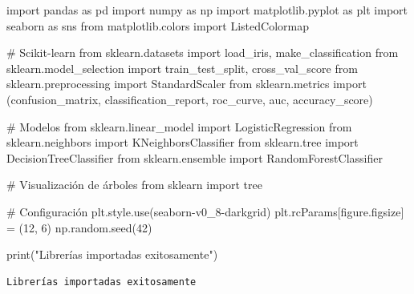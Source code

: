 \documentclass[
  doc,
  floatsintext,
  longtable,
  a4paper,
  nolmodern,
  notxfonts,
  notimes,
  12pt,
  colorlinks=true,linkcolor=blue,citecolor=blue,urlcolor=blue]{apa7}
\newenvironment{Shaded}{\begin{snugshade}}{\end{snugshade}}
\newcommand{\BuiltInTok}[1]{\textcolor[rgb]{0.00,0.23,0.31}{#1}}
\newcommand{\CommentTok}[1]{\textcolor[rgb]{0.37,0.37,0.37}{#1}}
\newcommand{\DecValTok}[1]{\textcolor[rgb]{0.68,0.00,0.00}{#1}}
\newcommand{\ImportTok}[1]{\textcolor[rgb]{0.00,0.46,0.62}{#1}}
\newcommand{\NormalTok}[1]{\textcolor[rgb]{0.00,0.23,0.31}{#1}}
\newcommand{\OperatorTok}[1]{\textcolor[rgb]{0.37,0.37,0.37}{#1}}
\newcommand{\StringTok}[1]{\textcolor[rgb]{0.13,0.47,0.30}{#1}}
\begin{document}
\begin{Shaded}
\begin{Highlighting}[]
\ImportTok{import}\NormalTok{ pandas }\ImportTok{as}\NormalTok{ pd}
\ImportTok{import}\NormalTok{ numpy }\ImportTok{as}\NormalTok{ np}
\ImportTok{import}\NormalTok{ matplotlib.pyplot }\ImportTok{as}\NormalTok{ plt}
\ImportTok{import}\NormalTok{ seaborn }\ImportTok{as}\NormalTok{ sns}
\ImportTok{from}\NormalTok{ matplotlib.colors }\ImportTok{import}\NormalTok{ ListedColormap}

\CommentTok{\# Scikit{-}learn}
\ImportTok{from}\NormalTok{ sklearn.datasets }\ImportTok{import}\NormalTok{ load\_iris, make\_classification}
\ImportTok{from}\NormalTok{ sklearn.model\_selection }\ImportTok{import}\NormalTok{ train\_test\_split, cross\_val\_score}
\ImportTok{from}\NormalTok{ sklearn.preprocessing }\ImportTok{import}\NormalTok{ StandardScaler}
\ImportTok{from}\NormalTok{ sklearn.metrics }\ImportTok{import}\NormalTok{ (confusion\_matrix, classification\_report, }
\NormalTok{                             roc\_curve, auc, accuracy\_score)}

\CommentTok{\# Modelos}
\ImportTok{from}\NormalTok{ sklearn.linear\_model }\ImportTok{import}\NormalTok{ LogisticRegression}
\ImportTok{from}\NormalTok{ sklearn.neighbors }\ImportTok{import}\NormalTok{ KNeighborsClassifier}
\ImportTok{from}\NormalTok{ sklearn.tree }\ImportTok{import}\NormalTok{ DecisionTreeClassifier}
\ImportTok{from}\NormalTok{ sklearn.ensemble }\ImportTok{import}\NormalTok{ RandomForestClassifier}

\CommentTok{\# Visualización de árboles}
\ImportTok{from}\NormalTok{ sklearn }\ImportTok{import}\NormalTok{ tree}

\CommentTok{\# Configuración}
\NormalTok{plt.style.use(}\StringTok{\textquotesingle{}seaborn{-}v0\_8{-}darkgrid\textquotesingle{}}\NormalTok{)}
\NormalTok{plt.rcParams[}\StringTok{\textquotesingle{}figure.figsize\textquotesingle{}}\NormalTok{] }\OperatorTok{=}\NormalTok{ (}\DecValTok{12}\NormalTok{, }\DecValTok{6}\NormalTok{)}
\NormalTok{np.random.seed(}\DecValTok{42}\NormalTok{)}

\BuiltInTok{print}\NormalTok{(}\StringTok{"Librerías importadas exitosamente"}\NormalTok{)}
\end{Highlighting}
\end{Shaded}

\begin{verbatim}
Librerías importadas exitosamente
\end{verbatim}
\end{document}
